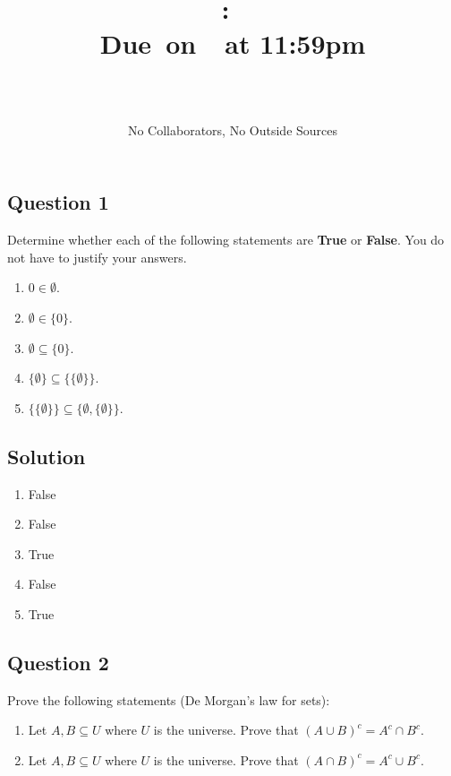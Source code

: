 \documentclass{article}
\title{
    \vspace{2in}
    \textbf{\hmwkClass:\ \hmwkTitle}\\
    \normalsize\vspace{0.1in}\small{Due\ on\ \hmwkDueDate\ at 11:59pm}\\
    \vspace{0.1in}\large{\textit{\hmwkClassInstructor}}
    \vspace{3in}
    \author{\textbf{\hmwkAuthorName} \\ \\ \small No Collaborators, No Outside Sources}
    \date{}
}
\begin{document}
\maketitle
\pagebreak

\subsection*{Question 1}
    Determine whether each of the following statements are \textbf{True} %
    or \textbf{False}. You do not have to justify your answers.
    \begin{enumerate}
        \item $0 \in \emptyset$.
        \item $\emptyset \in \{0\}$.
        \item $\emptyset \subseteq \{0\}$.
        \item $\{\emptyset\} \subseteq \{\{\emptyset\}\}$.
        \item $\{\{\emptyset\}\} \subseteq \{\emptyset, \{\emptyset\}\}$.
    \end{enumerate}
    
\subsection*{Solution}
    \begin{enumerate}
        \item False
        \item False
        \item True
        \item False
        \item True
    \end{enumerate}

\subsection*{Question 2}
    Prove the following statements (De Morgan's law for sets):
    \begin{enumerate}
        \item Let $A, B \subseteq U$ where $U$ is the universe. Prove that $(A \cup B)^{c} = A^{c} \cap B^{c}$.
        \item Let $A, B \subseteq U$ where $U$ is the universe. Prove that $(A \cap B)^{c} = A^{c} \cup B^{c}$.
    \end{enumerate}
\end{document}
